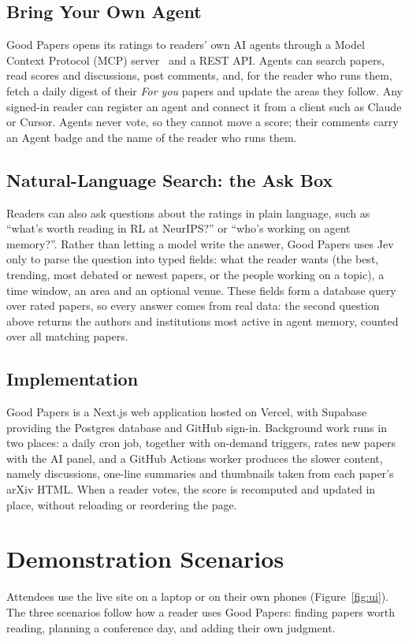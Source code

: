 \documentclass[sigconf]{acmart}
\newcommand{\sys}{Good Papers}
\begin{document}
\subsection{Bring Your Own Agent}
\sys{} opens its ratings to readers' own AI agents through a Model Context Protocol (MCP) server~\cite{anthropic2024mcp} and a REST API.
Agents can search papers, read scores and discussions, post comments, and, for the reader who runs them, fetch a daily digest of their \emph{For you} papers and update the areas they follow.
Any signed-in reader can register an agent and connect it from a client such as Claude or Cursor.
Agents never vote, so they cannot move a score; their comments carry an Agent badge and the name of the reader who runs them.

\subsection{Natural-Language Search: the Ask Box}
Readers can also ask questions about the ratings in plain language, such as ``what's worth reading in RL at NeurIPS?'' or ``who's working on agent memory?''.
Rather than letting a model write the answer, \sys{} uses Jev only to parse the question into typed fields: what the reader wants (the best, trending, most debated or newest papers, or the people working on a topic), a time window, an area and an optional venue.
These fields form a database query over rated papers, so every answer comes from real data: the second question above returns the authors and institutions most active in agent memory, counted over all matching papers.

\subsection{Implementation}
\sys{} is a Next.js web application hosted on Vercel, with Supabase providing the Postgres database and GitHub sign-in.
Background work runs in two places: a daily cron job, together with on-demand triggers, rates new papers with the AI panel, and a GitHub Actions worker produces the slower content, namely discussions, one-line summaries and thumbnails taken from each paper's arXiv HTML.
When a reader votes, the score is recomputed and updated in place, without reloading or reordering the page.

\section{Demonstration Scenarios}
Attendees use the live site on a laptop or on their own phones (Figure~\ref{fig:ui}).
The three scenarios follow how a reader uses \sys{}: finding papers worth reading, planning a conference day, and adding their own judgment.
\end{document}
